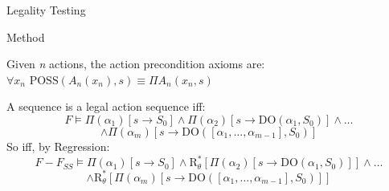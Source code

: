 \begin{frame}{Legality Testing}
    \vspace*{-0.5cm}
    \begin{block}{Method}
    \raggedright
    Given \textit{n} actions, the action precondition axioms are:
        \centering $ \forall x_n \text{ POSS}(A_n(x_n), s) \equiv \Pi A_n(x_n, s) $ \\ 
    \raggedright
    A sequence is a legal action sequence iff:     
        \[ \textit{F} \models \Pi(\alpha_1)[s \rightarrow S_0] \land \Pi(\alpha_2)[s \rightarrow \text{DO}(\alpha_1, S_0)] \land \ldots \]
        \[ \land \Pi(\alpha_m)[s \rightarrow \text{DO}([\alpha_1, \ldots, \alpha_{m-1}], S_0)] \]
    So iff, by Regression:
        \[ \textit{F} - \textit{F}_{\textit{SS}} \models \Pi(\alpha_1)[s \rightarrow S_0] \land \text{R}^*_{\theta}[\Pi(\alpha_2)[s \rightarrow \text{DO}(\alpha_1, S_0)]] \land \ldots \]
        \[ \land \text{R}^*_{\theta}[\Pi(\alpha_m)[s \rightarrow \text{DO}([\alpha_1, \ldots, \alpha_{m-1}], S_0)]] \]
    \end{block}
\end{frame}
